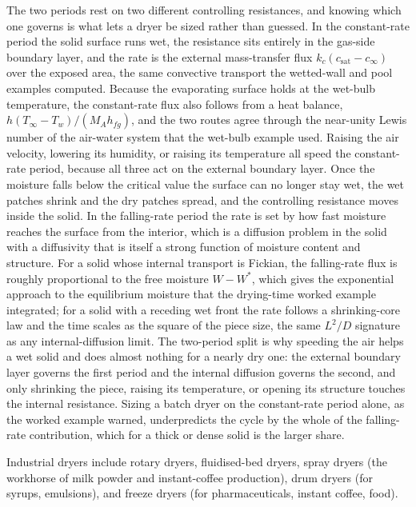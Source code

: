The two periods rest on two different controlling resistances, and knowing
which one governs is what lets a dryer be sized rather than guessed. In the
constant-rate period the solid surface runs wet, the resistance sits entirely
in the gas-side boundary layer, and the rate is the external mass-transfer
flux $k_c(c_{\text{sat}} - c_\infty)$ over the exposed area, the same
convective transport the wetted-wall and pool examples computed. Because the
evaporating surface holds at the wet-bulb temperature, the constant-rate flux
also follows from a heat balance, $h(T_\infty - T_w)/(M_A h_{fg})$, and the two
routes agree through the near-unity Lewis number of the air-water system that
the wet-bulb example used. Raising the air velocity, lowering its humidity, or
raising its temperature all speed the constant-rate period, because all three
act on the external boundary layer. Once the moisture falls below the critical
value the surface can no longer stay wet, the wet patches shrink and the dry
patches spread, and the controlling resistance moves inside the solid. In the
falling-rate period the rate is set by how fast moisture reaches the surface
from the interior, which is a diffusion problem in the solid with a diffusivity
that is itself a strong function of moisture content and structure. For a solid
whose internal transport is Fickian, the falling-rate flux is roughly
proportional to the free moisture $W - W^{*}$, which gives the exponential
approach to the equilibrium moisture that the drying-time worked example
integrated; for a solid with a receding wet front the rate follows a
shrinking-core law and the time scales as the square of the piece size, the
same $L^2/D$ signature as any internal-diffusion limit. The two-period split is
why speeding the air helps a wet solid and does almost nothing for a nearly dry
one: the external boundary layer governs the first period and the internal
diffusion governs the second, and only shrinking the piece, raising its
temperature, or opening its structure touches the internal resistance. Sizing a
batch dryer on the constant-rate period alone, as the worked example warned,
underpredicts the cycle by the whole of the falling-rate contribution, which
for a thick or dense solid is the larger share.

Industrial dryers include rotary dryers, fluidised-bed dryers, spray
dryers (the workhorse of milk powder and instant-coffee production),
drum dryers (for syrups, emulsions), and freeze dryers (for
pharmaceuticals, instant coffee, food).

